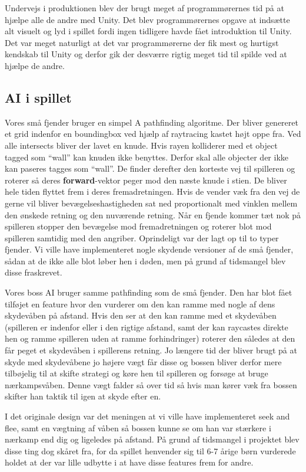 Undervejs i produktionen blev der brugt meget af programmørernes tid på at hjælpe alle de andre med Unity. Det blev programmørernes opgave at indsætte alt visuelt og lyd i spillet fordi ingen tidligere havde fået introduktion til Unity. Det var meget naturligt at det var programmørerne der fik mest og hurtigst kendskab til Unity og derfor gik der desværre rigtig meget tid til spilde ved at hjælpe de andre.

\subsection{AI i spillet}

Vores små fjender bruger en simpel A\* pathfinding algoritme. Der bliver genereret et grid indenfor en boundingbox ved hjælp af raytracing kastet højt oppe fra. Ved alle intersects bliver der lavet en knude. Hvis rayen kolliderer med et object tagged som ``wall'' kan knuden ikke benyttes. Derfor skal alle objecter der ikke kan paseres tagges som ``wall''.
De finder derefter den korteste vej til spilleren og roterer så deres \textbf{forward}-vektor peger mod den næste knude i stien. De bliver hele tiden flyttet frem i deres fremadretningen. Hvis de vender væk fra den vej de gerne vil bliver bevægelseshastigheden sat ned proportionalt med vinklen mellem den ønskede retning og den nuværende retning.
Når en fjende kommer tæt nok på spilleren stopper den bevægelse mod fremadretningen og roterer blot mod spilleren samtidig med den angriber. 
Oprindeligt var der lagt op til to typer fjender. Vi ville have implementeret nogle skydende versioner af de små fjender, sådan at de ikke alle blot løber hen i døden, men på grund af tidsmangel blev disse fraskrevet.

Vores boss AI bruger samme pathfinding som de små fjender. Den har blot fået tilføjet en feature hvor den vurderer om den kan ramme med nogle af dens skydevåben på afstand. Hvis den ser at den kan ramme med et skydevåben (spilleren er indenfor eller i den rigtige afstand, samt der kan raycastes direkte hen og ramme spilleren uden at ramme forhindringer) roterer den således at den får peget et skydevåben i spillerens retning. Jo længere tid der bliver brugt på at skyde med skydevåbene jo højere vægt får disse og bossen bliver derfor mere tilbøjelig til at skifte strategi og køre hen til spilleren og forsøge at bruge nærkampsvåben. Denne vægt falder så over tid så hvis man kører væk fra bossen skifter han taktik til igen at skyde efter en.

I det originale design var det meningen at vi ville have implementeret seek and flee, samt en vægtning af våben så bossen kunne se om han var stærkere i nærkamp end dig og ligeledes på afstand. På grund af tidsmangel i projektet blev disse ting dog skåret fra, for da spillet henvender sig til 6-7 årige børn vurderede holdet at der var lille udbytte i at have disse features frem for andre.

